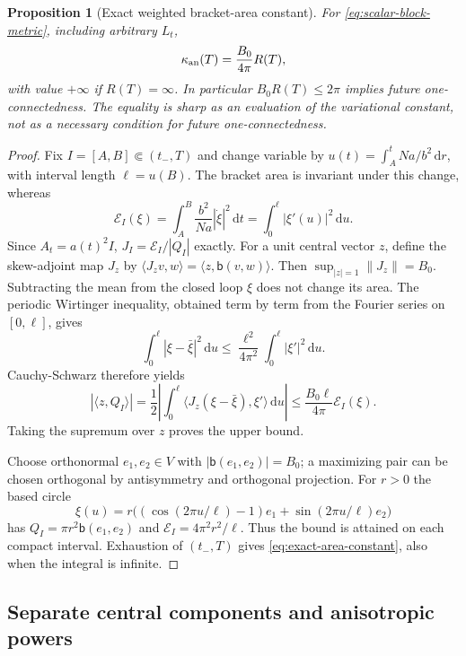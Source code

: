 \documentclass[10pt,a4paper]{article}
\numberwithin{equation}{section}
\newtheorem{proposition}[theorem]{Proposition}
\theoremstyle{definition}
\theoremstyle{remark}
\newcommand{\dd}{\mathrm d}
\begin{document}
\begin{proposition}[Exact weighted bracket-area constant]
\label{prop:exact-area}
For \eqref{eq:scalar-block-metric}, including arbitrary $L_t$,
\begin{equation}
 \kappa_{\rm an}(T)=\frac{B_0}{4\pi}R(T),
 \label{eq:exact-area-constant}
\end{equation}
with value $+\infty$ if $R(T)=\infty$.
In particular $B_0R(T)\le2\pi$ implies future one-connectedness.
The equality is sharp as an evaluation of the variational constant,
not as a necessary condition for future one-connectedness.
\end{proposition}

\begin{proof}
Fix $I=[A,B]\Subset(t_-,T)$ and change variable by
$u(t)=\int_A^t Na/b^2\,\dd r$, with interval length $\ell=u(B)$.
The bracket area is invariant under this change, whereas
\[
 \mathcal E_I(\xi)=\int_A^B\frac{b^2}{Na}|\dot\xi|^2\,\dd t
 =\int_0^\ell|\xi'(u)|^2\,\dd u.
\]
Since $A_t=a(t)^2I$, $J_I=\mathcal E_I/|Q_I|$ exactly.
For a unit central vector $z$, define the skew-adjoint map $J_z$ by
$\langle J_zv,w\rangle=\langle z,\mathsf b(v,w)\rangle$.
Then $\sup_{|z|=1}\|J_z\|=B_0$.  Subtracting the mean from the closed
loop $\xi$ does not change its area.  The periodic Wirtinger inequality,
obtained term by term from the Fourier series on $[0,\ell]$, gives
\[
 \int_0^\ell|\xi-\bar\xi|^2\,\dd u
 \le\frac{\ell^2}{4\pi^2}\int_0^\ell|\xi'|^2\,\dd u.
\]
Cauchy-Schwarz therefore yields
\[
 |\langle z,Q_I\rangle|
 =\frac12\left|\int_0^\ell
 \langle J_z(\xi-\bar\xi),\xi'\rangle\,\dd u\right|
 \le\frac{B_0\ell}{4\pi}\mathcal E_I(\xi).
\]
Taking the supremum over $z$ proves the upper bound.

Choose orthonormal $e_1,e_2\in V$ with
$|\mathsf b(e_1,e_2)|=B_0$; a maximizing pair can be chosen orthogonal
by antisymmetry and orthogonal projection.  For $r>0$ the based circle
\[
 \xi(u)=r\bigl((\cos(2\pi u/\ell)-1)e_1+
 \sin(2\pi u/\ell)e_2\bigr)
\]
has $Q_I=\pi r^2\mathsf b(e_1,e_2)$ and
$\mathcal E_I=4\pi^2r^2/\ell$.  Thus the bound is attained on each
compact interval.  Exhaustion of $(t_-,T)$ gives
\eqref{eq:exact-area-constant}, also when the integral is infinite.
\end{proof}

\subsection{Separate central components and anisotropic powers}
\label{subsec:central-component-filling}
\end{document}
